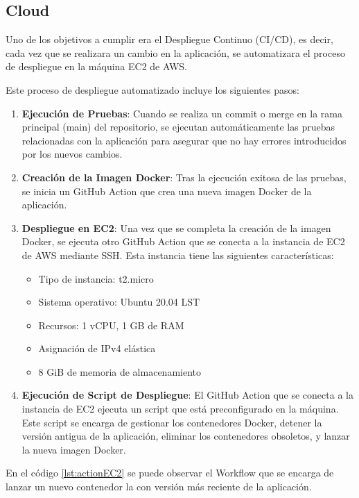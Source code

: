 \subsection{Cloud}

Uno de los objetivos a cumplir era el Despliegue Continuo (CI/CD), es decir, cada vez que se realizara un cambio en la aplicación, se automatizara el proceso de despliegue en
la máquina EC2 de AWS.

Este proceso de despliegue automatizado incluye los siguientes pasos:
\begin{enumerate}
    \item \textbf{Ejecución de Pruebas}: Cuando se realiza un commit o merge en la rama principal (main) del repositorio, se ejecutan automáticamente las pruebas relacionadas con la
     aplicación para asegurar que no hay errores introducidos por los nuevos cambios.
    \item \textbf{Creación de la Imagen Docker}: Tras la ejecución exitosa de las pruebas, se inicia un GitHub Action que crea una nueva imagen Docker de la aplicación.
    \item  \textbf{Despliegue en EC2}: Una vez que se completa la creación de la imagen Docker, se ejecuta otro GitHub Action que se conecta a la instancia de EC2 de AWS mediante SSH.
        Esta instancia tiene las siguientes características:\begin{itemize}
            \item Tipo de instancia: t2.micro
            \item Sistema operativo: Ubuntu 20.04 LST
            \item Recursos: 1 vCPU, 1 GB de RAM
            \item Asignación de IPv4 elástica
            \item 8 GiB de memoria de almacenamiento
        \end{itemize}
    \item  \textbf{Ejecución de Script de Despliegue}: El GitHub Action que se conecta a la instancia de EC2 ejecuta un script que está preconfigurado en la máquina. 
    Este script se encarga de gestionar los contenedores Docker, detener la versión antigua de la aplicación, eliminar los contenedores obsoletos, y 
    lanzar la nueva imagen Docker.
\end{enumerate}
En el código \ref{lst:actionEC2} se puede observar el Workflow que se encarga de lanzar un nuevo contenedor la con versión más reciente de la aplicación.
